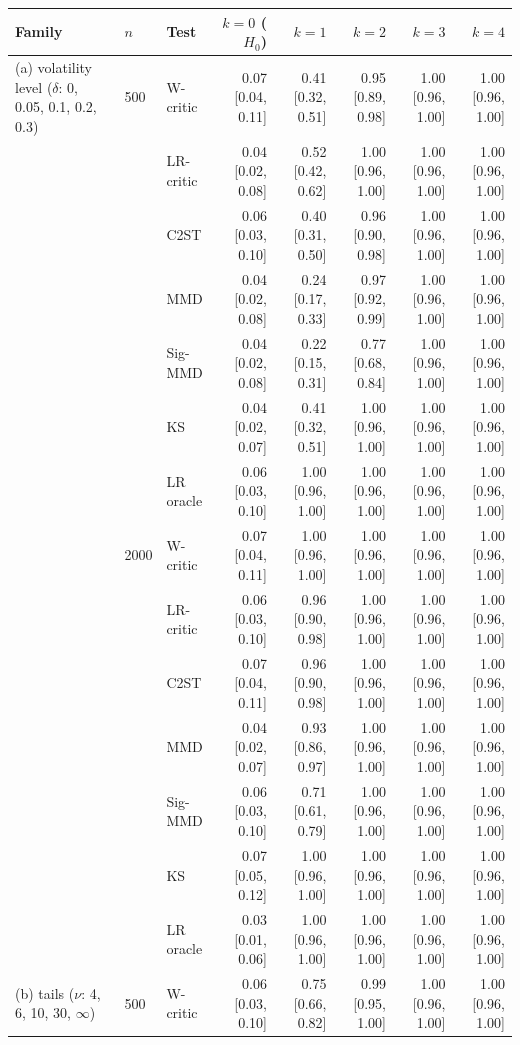 \begin{tabular}{lllrrrrr}
\toprule
Family & $n$ & Test & $k=0$ ($H_0$) & $k=1$ & $k=2$ & $k=3$ & $k=4$ \\
\midrule
(a) volatility level ($\delta$: 0, 0.05, 0.1, 0.2, 0.3) & 500 & W-critic & 0.07 [0.04, 0.11] & 0.41 [0.32, 0.51] & 0.95 [0.89, 0.98] & 1.00 [0.96, 1.00] & 1.00 [0.96, 1.00] \\
 &  & LR-critic & 0.04 [0.02, 0.08] & 0.52 [0.42, 0.62] & 1.00 [0.96, 1.00] & 1.00 [0.96, 1.00] & 1.00 [0.96, 1.00] \\
 &  & C2ST & 0.06 [0.03, 0.10] & 0.40 [0.31, 0.50] & 0.96 [0.90, 0.98] & 1.00 [0.96, 1.00] & 1.00 [0.96, 1.00] \\
 &  & MMD & 0.04 [0.02, 0.08] & 0.24 [0.17, 0.33] & 0.97 [0.92, 0.99] & 1.00 [0.96, 1.00] & 1.00 [0.96, 1.00] \\
 &  & Sig-MMD & 0.04 [0.02, 0.08] & 0.22 [0.15, 0.31] & 0.77 [0.68, 0.84] & 1.00 [0.96, 1.00] & 1.00 [0.96, 1.00] \\
 &  & KS & 0.04 [0.02, 0.07] & 0.41 [0.32, 0.51] & 1.00 [0.96, 1.00] & 1.00 [0.96, 1.00] & 1.00 [0.96, 1.00] \\
 &  & LR oracle & 0.06 [0.03, 0.10] & 1.00 [0.96, 1.00] & 1.00 [0.96, 1.00] & 1.00 [0.96, 1.00] & 1.00 [0.96, 1.00] \\
 & 2000 & W-critic & 0.07 [0.04, 0.11] & 1.00 [0.96, 1.00] & 1.00 [0.96, 1.00] & 1.00 [0.96, 1.00] & 1.00 [0.96, 1.00] \\
 &  & LR-critic & 0.06 [0.03, 0.10] & 0.96 [0.90, 0.98] & 1.00 [0.96, 1.00] & 1.00 [0.96, 1.00] & 1.00 [0.96, 1.00] \\
 &  & C2ST & 0.07 [0.04, 0.11] & 0.96 [0.90, 0.98] & 1.00 [0.96, 1.00] & 1.00 [0.96, 1.00] & 1.00 [0.96, 1.00] \\
 &  & MMD & 0.04 [0.02, 0.07] & 0.93 [0.86, 0.97] & 1.00 [0.96, 1.00] & 1.00 [0.96, 1.00] & 1.00 [0.96, 1.00] \\
 &  & Sig-MMD & 0.06 [0.03, 0.10] & 0.71 [0.61, 0.79] & 1.00 [0.96, 1.00] & 1.00 [0.96, 1.00] & 1.00 [0.96, 1.00] \\
 &  & KS & 0.07 [0.05, 0.12] & 1.00 [0.96, 1.00] & 1.00 [0.96, 1.00] & 1.00 [0.96, 1.00] & 1.00 [0.96, 1.00] \\
 &  & LR oracle & 0.03 [0.01, 0.06] & 1.00 [0.96, 1.00] & 1.00 [0.96, 1.00] & 1.00 [0.96, 1.00] & 1.00 [0.96, 1.00] \\
(b) tails ($\nu$: 4, 6, 10, 30, $\infty$) & 500 & W-critic & 0.06 [0.03, 0.10] & 0.75 [0.66, 0.82] & 0.99 [0.95, 1.00] & 1.00 [0.96, 1.00] & 1.00 [0.96, 1.00] \\

\end{tabular}
